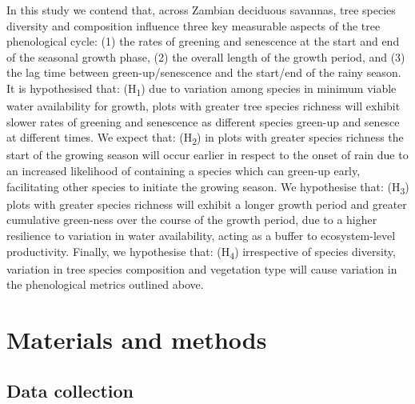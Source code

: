\documentclass[11pt,a4paper]{article}
\begin{document}
In this study we contend that, across Zambian deciduous savannas, tree species diversity and composition influence three key measurable aspects of the tree phenological cycle: (1) the rates of greening and senescence at the start and end of the seasonal growth phase, (2) the overall length of the growth period, and (3) the lag time between green-up/senescence and the start/end of the rainy season. It is hypothesised that: (H\textsubscript{1}) due to variation among species in minimum viable water availability for growth, plots with greater tree species richness will exhibit slower rates of greening and senescence as different species green-up and senesce at different times. We expect that: (H\textsubscript{2}) in plots with greater species richness the start of the growing season will occur earlier in respect to the onset of rain due to an increased likelihood of containing a species which can green-up early, facilitating other species to initiate the growing season. We hypothesise that: (H\textsubscript{3}) plots with greater species richness will exhibit a longer growth period and greater cumulative green-ness over the course of the growth period, due to a higher resilience to variation in water availability, acting as a buffer to ecosystem-level productivity. Finally, we hypothesise that: (H\textsubscript{4}) irrespective of species diversity, variation in tree species composition and vegetation type will cause variation in the phenological metrics outlined above. 

\section{Materials and methods}

\subsection{Data collection}
\end{document}
